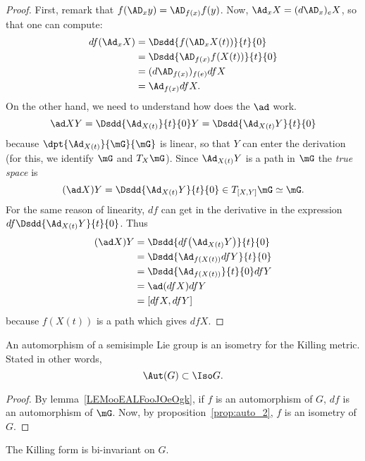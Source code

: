 \begin{proof}
	First, remark that $f(\AD_xy)=\AD_{f(x)}f(y)$. Now, $\Ad_x X=(d\AD_x)_eX$, so that one can compute:
	\begin{equation}
		\begin{split}
			df(\Ad_xX)&=\Dsdd{f(\AD_xX(t))}{t}{0}\\
			&=\Dsdd{   \AD_{f(x)}f(X(t))  }{t}{0}\\
			&=(d\AD_{f(x)})_{f(e)}df X\\
			&=\Ad_{f(x)}df X.
		\end{split}
	\end{equation}
	On the other hand, we need to understand how does the $\ad$ work.
	\[
		\ad XY=\Dsdd{\Ad_{X(t)}}{t}{0}Y=\Dsdd{\Ad_{X(t)}Y}{t}{0}
	\]
	because $\dpt{\Ad_{X(t)}}{\mG}{\mG}$ is linear, so that $Y$ can enter the derivation (for this, we identify $\mG$ and $T_X\mG$). Since $\Ad_{X(t)}Y$ is a path in $\mG$ the \emph{true space} is
	\[
		(\ad X)Y=\Dsdd{ \Ad_{X(t)}Y }{t}{0}\in T_{[X,Y]}\mG\simeq\mG.
	\]
	For the same reason of linearity, $df$ can get in the derivative in the expression $df\Dsdd{  \Ad_{X(t)}Y  }{t}{0}$. Thus
	\begin{equation}
		\begin{split}
			(\ad X)Y&=\Dsdd{  df\big(\Ad_{X(t)}Y\big)  }{t}{0}\\
			&=\Dsdd{  \Ad_{ f(X(t)) }df Y  }{t}{0}\\
			&=\Dsdd{ \Ad_{f(X(t))} }{t}{0}df Y\\
			&=\ad(dfX)df Y\\
			&=[dfX,df Y]
		\end{split}
	\end{equation}
	because $f(X(t))$ is a path which gives $df X$.
\end{proof}

\begin{corollary}
	An automorphism of a semisimple Lie group is an isometry for the Killing metric. Stated in other words,
	\begin{equation}\label{eq:Aut_Iso}
		\Aut(G)\subset\Iso G.
	\end{equation}
\end{corollary}

\begin{proof}
	By lemma~\ref{LEMooEALFooJOeOgk}, if $f$ is an automorphism of $G$, $df$ is an automorphism of $\mG$. Now, by proposition~\ref{prop:auto_2}, $f$ is an isometry of $G$.
\end{proof}

\begin{theorem}
	The Killing form is bi-invariant on $G$.
	\label{tho:bi_invariance}
\end{theorem}

